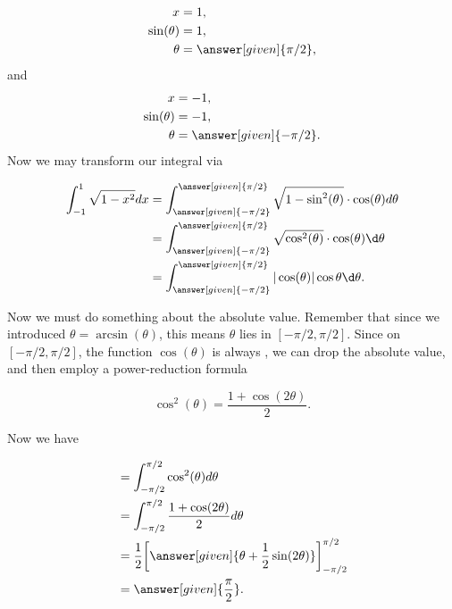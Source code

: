 \documentclass{ximera}
\begin{document}
\begin{example}
\begin{explanation}
    \begin{align*}
      x &= 1,\\
      \sin(\theta) &= 1,\\
      \theta &= \answer[given]{\pi/2},
    \end{align*}
    and
    \begin{align*}
      x &= -1,\\
      \sin(\theta) &= -1,\\
      \theta &= \answer[given]{-\pi/2}.
    \end{align*}
    Now we may transform our integral via
    \begin{image}
    \end{image}
    \begin{align*}
      \int_{-1}^1\sqrt{1-x^2} dx &= \int_{\answer[given]{-\pi/2}}^{\answer[given]{\pi/2}} \sqrt{1-\sin^2(\theta)} \cdot \cos(\theta) d\theta \\
      &= \int_{\answer[given]{-\pi/2}}^{\answer[given]{\pi/2}} \sqrt{\cos^2(\theta)}\cdot \cos(\theta) \d\theta \\
      &=\int_{\answer[given]{-\pi/2}}^{\answer[given]{\pi/2}} |\cos(\theta)| \cos\theta \d\theta.
    \end{align*}
    
Now we must do something about the absolute value. Remember that since we 
introduced $\theta=\arcsin(\theta)$, this means $\theta$ lies in $[- \pi/2, \pi/2 ]$. 
Since on $[-\pi/2,\pi/2]$, the function $\cos(\theta)$ is always
    ,
    we can drop the absolute value, and then employ a power-reduction
    formula

    \[
    \cos^2(\theta)= \frac{1+\cos(2\theta)}{2}.
    \]

    Now we have

    \begin{align*}
      &= \int_{-\pi/2}^{\pi/2} \cos^2(\theta) d\theta \\
      &= \int_{-\pi/2}^{\pi/2} \frac{1+\cos(2\theta)}{2} d\theta\\
      &= \frac{1}{2} \bigg[\answer[given]{\theta +\frac{1}{2}\sin(2\theta)}\bigg]_{-\pi/2}^{\pi/2}\\
      &=\answer[given]{\frac{\pi}{2}}.
    \end{align*}


\end{explanation}
\end{example}
\end{document}
